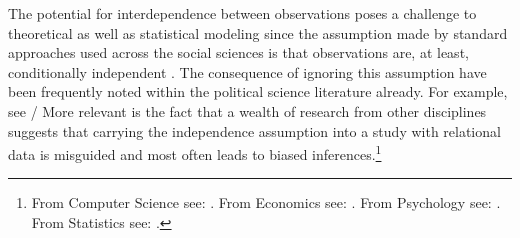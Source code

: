 
The potential for interdependence between observations poses a challenge to theoretical as well as statistical modeling since the assumption made by standard approaches used across the social sciences is that observations are, at least, conditionally independent \citep{snijders:2011}. The consequence of ignoring this assumption have been frequently noted within the political science literature already. For example, see \citet{beck:etal:1998,signorino:1999,hoff:ward:2004,franzese:hayes:2007,cranmer:desmarais:2011,erikson:pinto:2014}/  More relevant is the fact that a wealth of research from other disciplines suggests that carrying the independence assumption into a study with relational data is misguided and most often leads to biased inferences.\footnote{From Computer Science see: \citet{bonabeau:2002,brandes:erlebach:2005}. From Economics see: \citet{goyal:2012,jackson:2014}. From Psychology see: \citet{pattison:wasserman:1999,kenny:etal:2006}. From Statistics see: \citet{snijders:1996,hoff:etal:2002}.} 



